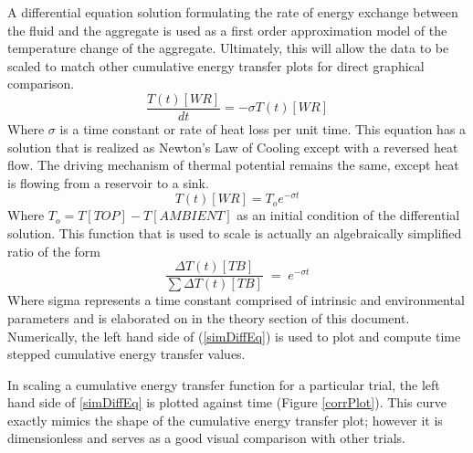A differential equation solution formulating the rate of energy exchange between the fluid and the aggregate is used as a first order approximation model of the temperature change of the aggregate. Ultimately, this will allow the data to be scaled to match other cumulative energy transfer plots for direct graphical comparison. 
\begin{equation}
\frac{T(t)[WR]}{dt}=-\sigma T(t)[WR]
\end{equation}
Where $\sigma$ is a time constant or rate of heat loss per unit time. This equation has a solution that is realized as Newton's Law of Cooling except with a reversed heat flow. The driving mechanism of thermal potential remains the same, except heat is flowing from a reservoir to a sink. 
\begin{equation}\label{dffsoln}
T(t)[WR] = T_{o}e^{-\sigma t}
\end{equation}
Where $T_{o}=T[TOP]-T[AMBIENT]$ as an initial condition of the differential solution.
This function that is used to scale is actually an algebraically simplified ratio of the form
\begin{equation}\label{simDiffEq}
\dfrac{\Delta T(t)[TB]}{\sum\Delta T(t)[TB]}\;=\;e^{-\sigma t}
\end{equation}
Where sigma represents a time constant comprised of intrinsic and environmental parameters and is elaborated on in the theory section of this document. Numerically, the left hand side of (\ref{simDiffEq}) is used to plot and compute time stepped cumulative energy transfer values.

In scaling a cumulative energy transfer function for a particular trial, the left hand side of \ref{simDiffEq} is plotted against time (Figure \ref{corrPlot}). This curve exactly mimics the shape of the cumulative energy transfer plot; however it is dimensionless and serves as a good visual comparison with other trials. 

